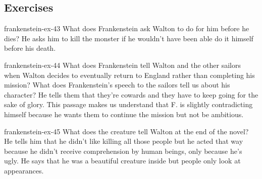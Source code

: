 \documentclass[preview]{standalone}
\begin{document}
\genpage


\subsection{Exercises}

\begin{snippetexercise}{frankenstein-ex-43}
    {What does Frankenstein ask Walton to do for him before he dies?}
    He asks him to kill the monster if he wouldn't have been able 
    do it himself before his death. 
\end{snippetexercise}

\begin{snippetexercise}{frankenstein-ex-44}
    {What does Frankenstein tell Walton and the other sailors when Walton decides to eventually
    return to England rather than completing his mission? What does Frankenstein's speech to the
    sailors tell us about his character?}
    He tells them that they're cowards and they have to keep going for the sake
    of glory. This passage makes us understand that F. is slightly contradicting himself
    because he wants them to continue the mission but not be ambitious.
\end{snippetexercise}

\begin{snippetexercise}{frankenstein-ex-45}
    {What does the creature tell Walton at the end of the novel?}
    He tells him that he didn't like killing all those people but he acted that
    way because he didn't receive comprehension by human beings, only because
    he's ugly. He says that he was a beautiful creature inside but people only look
    at appearances.
\end{snippetexercise}
\end{document}
